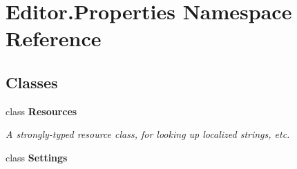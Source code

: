 \hypertarget{namespace_editor_1_1_properties}{}\section{Editor.\+Properties Namespace Reference}
\label{namespace_editor_1_1_properties}
\subsection*{Classes}
\begin{DoxyCompactItemize}
\item 
class {\bfseries Resources}
\begin{DoxyCompactList}\small\item\em A strongly-\/typed resource class, for looking up localized strings, etc. \end{DoxyCompactList}\item 
class {\bfseries Settings}
\end{DoxyCompactItemize}
